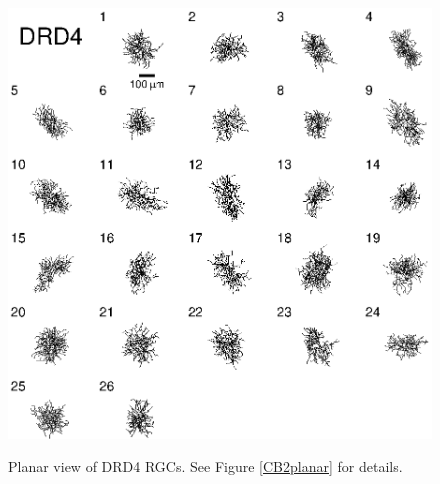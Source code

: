 \documentclass{article}
\begin{document}
\clearpage


\begin{figure}
  \centering
  {\includegraphics[scale=1.5]{Figures/SupFig1/DRD4-all-cells-1.eps}}
  \caption{Planar view of DRD4 RGCs. See Figure \ref{CB2planar} for details.}
\end{figure}
\end{document}
